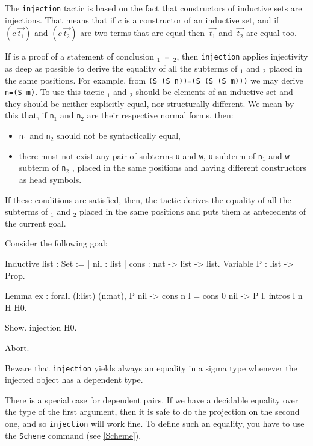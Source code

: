 \begin{coq_example*}
The {\tt injection} tactic is based on the fact that constructors of
inductive sets are injections. That means that if $c$ is a constructor
of an inductive set, and if $(c~\vec{t_1})$ and $(c~\vec{t_2})$ are two
terms that are equal then $~\vec{t_1}$ and $~\vec{t_2}$ are equal
too.

If {\term} is a proof of a statement of conclusion
 {\tt {\term$_1$} = {\term$_2$}},
then {\tt injection} applies injectivity as deep as possible to
derive the equality of all the subterms of {\term$_1$} and {\term$_2$}
placed in the same positions. For example, from {\tt (S
  (S n))=(S (S (S m)))} we may derive {\tt n=(S m)}.  To use this
tactic {\term$_1$} and {\term$_2$} should be elements of an inductive
set and they should be neither explicitly equal, nor structurally
different. We mean by this that, if {\tt n$_1$} and {\tt n$_2$} are
their respective normal forms, then:
\begin{itemize}
\item {\tt n$_1$} and {\tt n$_2$} should not be syntactically equal,
\item there must not exist any pair of subterms {\tt u} and {\tt w},
  {\tt u} subterm of {\tt n$_1$} and {\tt w} subterm of {\tt n$_2$} ,
  placed in the same positions and having different constructors as
  head symbols.
\end{itemize}
If these conditions are satisfied, then, the tactic derives the
equality of all the subterms of {\term$_1$} and {\term$_2$} placed in
the same positions and puts them as antecedents of the current goal.

\Example Consider the following goal:

\begin{coq_example*}
Inductive list : Set :=
  | nil : list
  | cons : nat -> list -> list.
Variable P : list -> Prop.
\end{coq_example*}
\begin{coq_eval}
Lemma ex :
 forall (l:list) (n:nat), P nil -> cons n l = cons 0 nil -> P l.
intros l n H H0.
\end{coq_eval}
\begin{coq_example}
Show.
injection H0.
\end{coq_example}
\begin{coq_eval}
Abort.
\end{coq_eval}

Beware that \texttt{injection} yields always an equality in a sigma type
whenever the injected object has a dependent type.

\Rem There is a special case for dependent pairs. If we have a decidable
equality over the type of the first argument, then it is safe to do
the projection on the second one, and so {\tt injection} will work fine.
To define such an equality, you have to use the {\tt Scheme} command
(see \ref{Scheme}).


\end{coq_example*}
